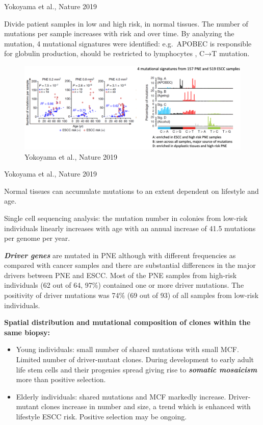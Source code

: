 Yokoyama et al., Nature 2019

Divide patient samples in low and high risk, in normal tissues. The number of mutations per sample increases with risk and over time. By analyzing the mutation, 4 mutational signatures were identified: e.g.~APOBEC is responsible for globulin production, should be restricted to lymphocytes , C→T mutation.

\begin{figure}
\centering
\includegraphics{../_resources/Screen_Shot_2022-11-04_at_10-51-30.png}
\caption{Yokoyama et al., Nature 2019}
\end{figure}

Yokoyama et al., Nature 2019

Normal tissues can accumulate mutations to an extent dependent on lifestyle and age.

Single cell sequencing analysis: the mutation number in colonies from low-risk individuals linearly increases with age with an annual increase of 41.5 mutations per genome per year.

\textbf{\emph{Driver genes}} are mutated in PNE although with different frequencies as compared with
cancer samples and there are substantial differences in the major drivers between PNE and ESCC. Most of the PNE samples from high-risk individuals (62 out of 64, 97\%) contained one or more driver mutations. The positivity of driver mutations was 74\% (69 out of 93) of all samples from low-risk individuals.

\textbf{Spatial distribution and mutational composition of clones within the same biopsy:}

\begin{itemize}
\tightlist
\item
  Young individuals: small number of shared mutations with small MCF. Limited number of driver-mutant clones. During development to early adult life stem cells and their progenies spread giving rise to \textbf{\emph{somatic mosaicism}} more than positive selection.
\item
  Elderly individuals: shared mutations and MCF markedly increase. Driver-mutant clones increase in number and size, a trend which is enhanced with lifestyle ESCC risk. Positive selection may be ongoing.
\end{itemize}

